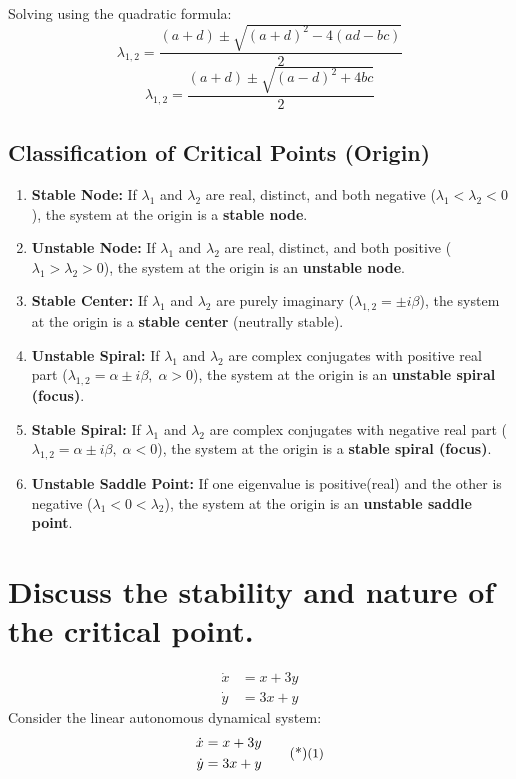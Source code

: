\noindent Solving using the quadratic formula:
\[
\lambda_{1,2} = \frac{(a + d) \pm \sqrt{(a + d)^2 - 4(ad - bc)}}{2}
\]
\[
\lambda_{1,2} = \frac{(a + d) \pm \sqrt{(a - d)^2 + 4bc}}{2}
\]

\subsection*{Classification of Critical Points (Origin)}

\begin{enumerate}
    \item \textbf{Stable Node:} If $\lambda_1$ and $\lambda_2$ are real, distinct, and both negative ($\lambda_1 < \lambda_2 < 0$), the system at the origin is a \textbf{stable node}.
    
    \item \textbf{Unstable Node:} If $\lambda_1$ and $\lambda_2$ are real, distinct, and both positive ($\lambda_1 > \lambda_2 > 0$), the system at the origin is an \textbf{unstable node}.
    
    \item \textbf{Stable Center:} If $\lambda_1$ and $\lambda_2$ are purely imaginary ($\lambda_{1,2} = \pm i\beta$), the system at the origin is a \textbf{stable center} (neutrally stable).
    
    \item \textbf{Unstable Spiral:} If $\lambda_1$ and $\lambda_2$ are complex conjugates with positive real part ($\lambda_{1,2} = \alpha \pm i\beta, \; \alpha > 0$), the system at the origin is an \textbf{unstable spiral (focus)}.
    
    \item \textbf{Stable Spiral:} If $\lambda_1$ and $\lambda_2$ are complex conjugates with negative real part ($\lambda_{1,2} = \alpha \pm i\beta, \; \alpha < 0$), the system at the origin is a \textbf{stable spiral (focus)}.
    
    \item \textbf{Unstable Saddle Point:} If one eigenvalue is positive(real) and the other is negative ($\lambda_1 < 0 < \lambda_2$), the system at the origin is an \textbf{unstable saddle point}.
\end{enumerate}
\section{Discuss the stability and nature of the critical point.}
\begin{align*}
        \dot{x} &= x + 3y \\
        \dot{y} &= 3x + y
    \end{align*}
Consider the linear autonomous dynamical system:
\begin{equation}
    \begin{aligned}
        \dot{x} &= x + 3y \\
        \dot{y} &= 3x + y
    \end{aligned} \sidenote{1}
\end{equation}

